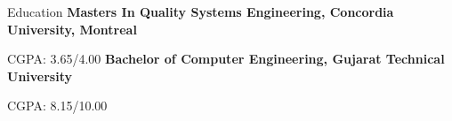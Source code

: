 \begin{rubric}{Education}
%
	\textbf{Masters In Quality Systems Engineering, Concordia University, Montreal}
	\par CGPA: 3.65/4.00
%
%
	\textbf{Bachelor of Computer Engineering, Gujarat Technical University}\par
	CGPA: 8.15/10.00
% 
\end{rubric}